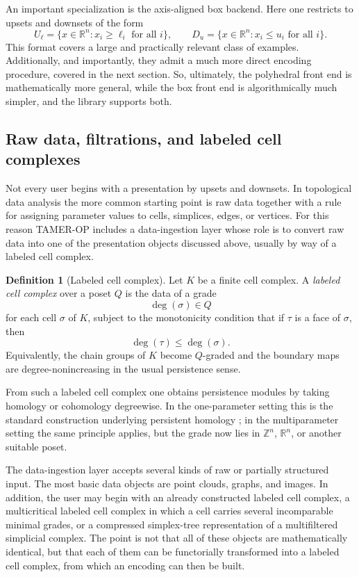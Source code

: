 \documentclass[11pt]{article}
\newcommand{\TAMER}{\textsc{TAMER-OP}}
\theoremstyle{definition}
\newtheorem{defn}[theorem]{Definition}
\theoremstyle{remark}
\begin{document}
An important specialization is the axis-aligned box backend.  Here one restricts to upsets and downsets of the form
\[
U_{\ell}=\{x\in\mathbb{R}^n:x_i\geq \ell_i\text{ for all }i\},
\qquad
D_u=\{x\in\mathbb{R}^n:x_i\leq u_i\text{ for all }i\}.
\]
This format covers a large and practically relevant class of examples. Additionally, and importantly, they admit a much more direct encoding procedure, covered in the next section. So, ultimately, the polyhedral front end is mathematically more general, while the box front end is algorithmically much simpler, and the library supports both.

\subsection{Raw data, filtrations, and labeled cell complexes}

Not every user begins with a presentation by upsets and downsets.  In topological data analysis the more common starting point is raw data together with a rule for assigning parameter values to cells, simplices, edges, or vertices.  For this reason \TAMER{} includes a data-ingestion layer whose role is to convert raw data into one of the presentation objects discussed above, usually by way of a labeled cell complex.

\begin{defn}[Labeled cell complex]
	Let \(K\) be a finite cell complex.  A \emph{labeled cell complex} over a poset \(Q\) is the data of a grade
	\[
	\deg(\sigma)\in Q
	\]
	for each cell \(\sigma\) of \(K\), subject to the monotonicity condition that if \(\tau\) is a face of \(\sigma\), then
	\[
	\deg(\tau)\leq \deg(\sigma).
	\]
	Equivalently, the chain groups of \(K\) become \(Q\)-graded and the boundary maps are degree-nonincreasing in the usual persistence sense.
\end{defn}

From such a labeled cell complex one obtains persistence modules by taking homology or cohomology degreewise.  In the one-parameter setting this is the standard construction underlying persistent homology \cite{ZC05}; in the multiparameter setting the same principle applies, but the grade now lies in \(\mathbb{Z}^n\), \(\mathbb{R}^n\), or another suitable poset.

The data-ingestion layer accepts several kinds of raw or partially structured input.  The most basic data objects are point clouds, graphs, and images.  In addition, the user may begin with an already constructed labeled cell complex, a multicritical labeled cell complex in which a cell carries several incomparable minimal grades, or a compressed simplex-tree representation of a multifiltered simplicial complex.  The point is not that all of these objects are mathematically identical, but that each of them can be functorially transformed into a labeled cell complex, from which an encoding can then be built.
\end{document}
